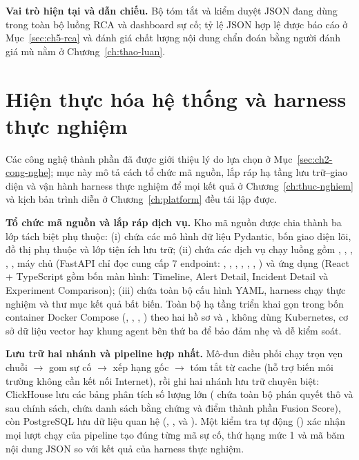 \textbf{Vai trò hiện tại và dẫn chiếu.} Bộ tóm tắt và kiểm duyệt JSON đang dùng trong toàn bộ luồng RCA và dashboard sự cố; tỷ lệ JSON hợp lệ được báo cáo ở Mục~\ref{sec:ch5-rca} và đánh giá chất lượng nội dung chẩn đoán bằng người đánh giá mù nằm ở Chương~\ref{ch:thao-luan}.

\section{Hiện thực hóa hệ thống và harness thực nghiệm}
\label{sec:ch4-impl}

Các công nghệ thành phần đã được giới thiệu lý do lựa chọn ở Mục~\ref{sec:ch2-cong-nghe}; mục này mô tả cách tổ chức mã nguồn, lắp ráp hạ tầng lưu trữ--giao diện và vận hành harness thực nghiệm để mọi kết quả ở Chương~\ref{ch:thuc-nghiem} và kịch bản trình diễn ở Chương~\ref{ch:platform} đều tái lập được.

\textbf{Tổ chức mã nguồn và lắp ráp dịch vụ.} Kho mã nguồn được chia thành ba lớp tách biệt phụ thuộc: (i)  chứa các mô hình dữ liệu Pydantic, bốn giao diện lõi, đồ thị phụ thuộc  và lớp tiện ích lưu trữ; (ii)  chứa các dịch vụ chạy luồng gồm , , , , , máy chủ  (FastAPI chỉ đọc cung cấp 7 endpoint: , , , , , , ) và ứng dụng  (React + TypeScript gồm bốn màn hình: Timeline, Alert Detail, Incident Detail và Experiment Comparison); (iii)  chứa toàn bộ cấu hình YAML, harness chạy thực nghiệm và thư mục kết quả bất biến. Toàn bộ hạ tầng triển khai gọn trong bốn container Docker Compose (, , , ) theo hai hồ sơ  và , không dùng Kubernetes, cơ sở dữ liệu vector hay khung agent bên thứ ba để bảo đảm nhẹ và dễ kiểm soát.

\textbf{Lưu trữ hai nhánh và pipeline hợp nhất.} Mô-đun điều phối  chạy trọn vẹn chuỗi \CTAV{} $\to$ gom sự cố $\to$ xếp hạng gốc $\to$ tóm tắt từ cache (hỗ trợ biến môi trường  không cần kết nối Internet), rồi ghi hai nhánh lưu trữ chuyên biệt: ClickHouse lưu các bảng phân tích số lượng lớn ( chứa toàn bộ phán quyết thô và sau chính sách,  chứa danh sách bằng chứng và điểm thành phần Fusion Score), còn PostgreSQL lưu dữ liệu quan hệ (, ,  và ). Một kiểm tra tự động () xác nhận mọi lượt chạy của pipeline tạo đúng từng mã sự cố, thứ hạng mức 1 và mã băm nội dung JSON so với kết quả của harness thực nghiệm.

